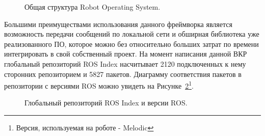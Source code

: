 \begin{figure}[ht]
  \caption{Общая структура Robot Operating System.}\label{fig:ros-compute-graph}
\end{figure}


Большими преимуществами использования данного фреймворка является возможность передачи сообщений по локальной сети и обширная библиотека уже реализованного ПО, которое можно без относительно больших затрат по времени интегрировать в свой собственный проект. На момент написания данной ВКР глобальный репозиторий ROS Index насчитывает 2120 подключенных к нему сторонних репозиторием и 5827 пакетов. Диаграмму соответствия пакетов в репозитории с версиями ROS можно увидеть на Рисунке~\ref{fig:ros-index}\footnote{Версия, используемая на роботе - Melodic}\cite{ros-index-stats}.

\begin{figure}[ht]
  \caption{Глобальный репозиторий ROS Index и версии ROS.}\label{fig:ros-index}
\end{figure}

